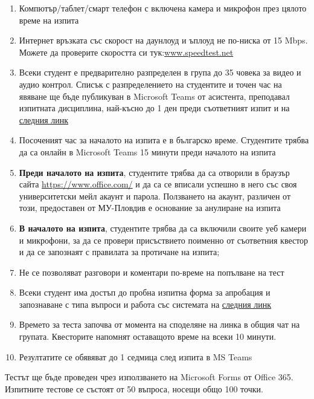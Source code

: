 \documentclass[13pt,a4paper]{article}
\begin{document}
    \begin{enumerate}

        \item Компютър/таблет/смарт телефон с включена камера и микрофон през цялото време на изпита
        \item Интернет връзката със скорост на даунлоуд и ъплоуд не по-ниска от 15 Mbps. Можете да проверите скоростта си тук:\href{https://www.speedtest.net/}{www.speedtest.net}
        \item Всеки студент е предварително разпределен в група до 35 човека за видео и аудио контрол. Списък с разпределението на студентите и точен час на явяване ще бъде публикуван в Microsoft Teams от асистента, преподавал изпитната дисциплина, най-късно до 1 ден преди съответният изпит и на \href{https://muplovdivbg.sharepoint.com/teams/FacultyofPublicHealth/Shared%20Documents/Forms/AllItems.aspx?csf=1&web=1&e=7TlGGB&cid=c99189b7%2Dd836%2D47cc%2Da5a2%2D3d04885bfeb1&RootFolder=%2Fteams%2FFacultyofPublicHealth%2FShared%20Documents%2F%D0%A1%D0%BE%D1%86%D0%B8%D0%B0%D0%BB%D0%BD%D0%B0%20%D0%BC%D0%B5%D0%B4%D0%B8%D1%86%D0%B8%D0%BD%D0%B0%20%D0%B8%20%D0%BE%D0%B1%D1%89%D0%B5%D1%81%D1%82%D0%B2%D0%B5%D0%BD%D0%BE%20%D0%B7%D0%B4%D1%80%D0%B0%D0%B2%D0%B5%20%2D%20Social%20medicine%20and%20public%20health&FolderCTID=0x012000DAF9907FD71CC142959689FC483FA4AC}{следния линк}
        \item 	Посоченият час за началото на изпита е в българско време. Студентите трябва да са онлайн в Microsoft Teams 15 минути преди началото на изпита
        \item\textbf{ Преди началото на изпита}, студентите трябва да са отворили в браузър сайта \href{https://www.office.com/}{https://www.office.com/} и да са се вписали успешно в него със своя университетски мейл акаунт и парола. Ползването на акаунт, различен от този, предоставен от МУ-Пловдив е основание за анулиране на изпита
        \item 	\textbf{В началото на изпита}, студентите трябва да са включили своите уеб камери и микрофони, за да се провери присъствието поименно от съответния квестор и да се запознаят с правилата за протичане на изпита;
        \item  Не се позволяват разговори и коментари по-време на попълване на тест
        \item  Всеки студент има достъп до пробна изпитна форма за апробация и запознаване с типа въпроси и работа със системата на \href{https://forms.office.com/Pages/ResponsePage.aspx?id=6myJOQCkhkerbLuRZH_g-R6xkpuTW9FAl9MVrsryF45UQTFKQkU4UjVQOFYzTkVUVVFVVzhGWVRBUy4u&wdLOR=c23E40142-2058-4E02-807D-BF3DE33599A8}{следния линк}
        \item Времето за теста започва от момента на споделяне на линка в общия чат на групата. Квесторите напомнят оставащото време на всеки 10 минути.
        \item Резултатите се обявяват до 1 седмица след изпита в MS Teams
    \end{enumerate}
    Тестът ще бъде проведен чрез използването на Microsoft Forms от Office 365. Изпитните тестове се състоят от 50 въпроса, носещи общо 100 точки.
\end{document}
